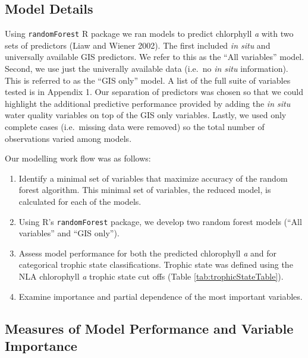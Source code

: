 \documentclass[12pt,]{article}
\begin{document}
\subsection{Model Details}\label{model-details}

Using \texttt{randomForest} R package we ran models to predict
chlorphyll \emph{a} with two sets of predictors (Liaw and Wiener 2002).
The first included \emph{in situ} and universally available GIS
predictors. We refer to this as the ``All variables'' model. Second, we
use just the univerally available data (i.e.~no \emph{in situ}
information). This is referred to as the ``GIS only'' model. A list of
the full suite of variables tested is in Appendix 1. Our separation of
predictors was chosen so that we could highlight the additional
predictive performance provided by adding the \emph{in situ} water
quality variables on top of the GIS only variables. Lastly, we used only
complete cases (i.e.~missing data were removed) so the total number of
observations varied among models.

Our modelling work flow was as follows:

\begin{enumerate}
\def\labelenumi{\arabic{enumi}.}
\itemsep1pt\parskip0pt
\item
  Identify a minimal set of variables that maximize accuracy of the
  random forest algorithm. This minimal set of variables, the reduced
  model, is calculated for each of the models.
\item
  Using R's \texttt{randomForest} package, we develop two random forest
  models (``All variables'' and ``GIS only'').
\item
  Assess model performance for both the predicted chlorophyll \emph{a}
  and for categorical trophic state classifications. Trophic state was
  defined using the NLA chlorophyll \emph{a} trophic state cut offs
  (Table \ref{tab:trophicStateTable}).
\item
  Examine importance and partial dependence of the most important
  variables.
\end{enumerate}

\subsection{Measures of Model Performance and Variable
Importance}\label{measures-of-model-performance-and-variable-importance}
\end{document}
